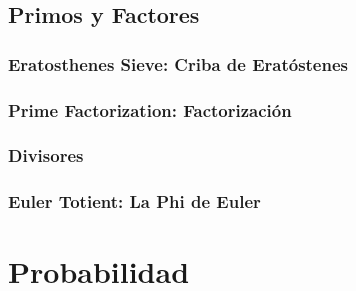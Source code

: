 \documentclass[12pt, fleqn]{report}                             %
\theoremstyle{break}                                            %
\begin{document}
        \section{Primos y Factores}

            \subsection{Eratosthenes Sieve: Criba de Eratóstenes}

            \subsection{Prime Factorization: Factorización}

            \subsection{Divisores}

            \subsection{Euler Totient: La Phi de Euler}


    \clearpage
    \chapter{Probabilidad}
\end{document}
